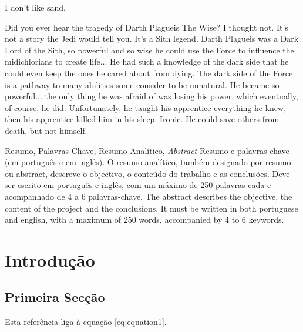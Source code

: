 \documentclass[portuguese]{ist-thesis}
\begin{document}
\makecover

\begin{dedication}
	I don't like sand.
\end{dedication}

\begin{acknowledgements}
	Did you ever hear the tragedy of Darth Plagueis The Wise? I thought not. It's not a story the Jedi would tell you. It's a Sith legend. Darth Plagueis was a Dark Lord of the Sith, so powerful and so wise he could use the Force to influence the midichlorians to create life... He had such a knowledge of the dark side that he could even keep the ones he cared about from dying. The dark side of the Force is a pathway to many abilities some consider to be unnatural. He became so powerful... the only thing he was afraid of was losing his power, which eventually, of course, he did. Unfortunately, he taught his apprentice everything he knew, then his apprentice killed him in his sleep. Ironic. He could save others from death, but not himself.
\end{acknowledgements}

\begin{tabstract}{Resumo, Palavras-Chave, Resumo Analítico, \textit{Abstract}}
	Resumo e palavras-chave (em português e em inglês). O resumo analítico, também designado por resumo ou abstract, descreve o objectivo, o conteúdo do trabalho e as conclusões. Deve ser escrito em português e inglês, com um máximo de 250 palavras cada e acompanhado de 4 a 6 palavras-chave.
	The abstract describes the objective, the content of the project and the conclusions. It must be written in both portuguese and english, with a maximum of 250 words, accompanied by 4 to 6 keywords.
\end{tabstract}

\tableofcontents

\listoffigures

\listoftables

\mainstart

\chapter{Introdução}

\lipsum[1]

\section{Primeira Secção}

Esta referência liga à equação \ref{eq:equation1}.
\end{document}
